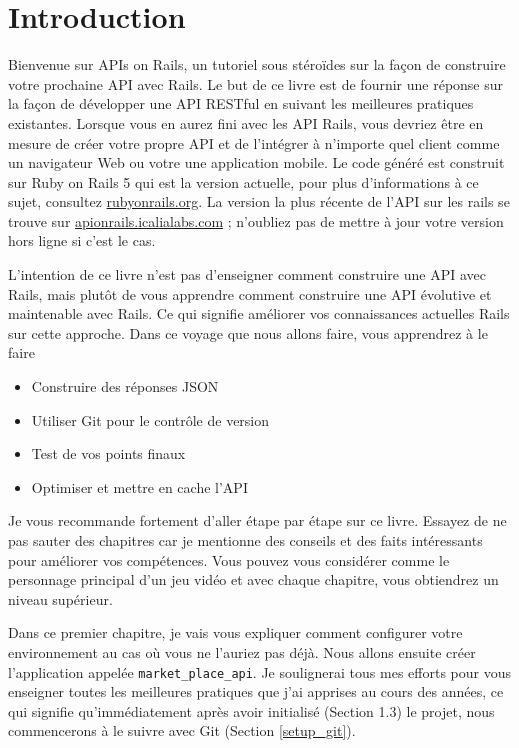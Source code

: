 \documentclass[]{report}
\begin{document}
\chapter{Introduction}

  Bienvenue sur APIs on Rails, un tutoriel sous stéroïdes sur la façon de construire votre prochaine API avec Rails. Le but de ce livre est de fournir une réponse sur la façon de développer une API RESTful en suivant les meilleures pratiques existantes. Lorsque vous en aurez fini avec les API Rails, vous devriez être en mesure de créer votre propre API et de l'intégrer à n'importe quel client comme un navigateur Web ou votre une application mobile. Le code généré est construit sur Ruby on Rails 5 qui est la version actuelle, pour plus d'informations à ce sujet, consultez \href{http://rubyonrails.org/}{rubyonrails.org}. La version la plus récente de l'API sur les rails se trouve sur \href{https://apionrails.icalialabs.com}{apionrails.icalialabs.com} ; n'oubliez pas de mettre à jour votre version hors ligne si c'est le cas.

  L'intention de ce livre n'est pas d'enseigner comment construire une API avec Rails, mais plutôt de vous apprendre comment construire une API évolutive et maintenable avec Rails. Ce qui signifie améliorer vos connaissances actuelles Rails  sur cette approche. Dans ce voyage que nous allons faire, vous apprendrez à le faire

  \begin{itemize}
    \item Construire des réponses JSON
    \item Utiliser Git pour le contrôle de version
    \item Test de vos points finaux
    \item Optimiser et mettre en cache l'API
  \end{itemize}

  Je vous recommande fortement d'aller étape par étape sur ce livre. Essayez de ne pas sauter des chapitres car je mentionne des conseils et des faits intéressants pour améliorer vos compétences. Vous pouvez vous considérer comme le personnage principal d'un jeu vidéo et avec chaque chapitre, vous obtiendrez un niveau supérieur.

  Dans ce premier chapitre, je vais vous expliquer comment configurer votre environnement au cas où vous ne l'auriez pas déjà. Nous allons ensuite créer l'application appelée \verb|market_place_api|. Je soulignerai tous mes efforts pour vous enseigner toutes les meilleures pratiques que j'ai apprises au cours des années, ce qui signifie qu'immédiatement après avoir initialisé (Section 1.3) le projet, nous commencerons à le suivre avec Git (Section \ref{setup_git}).
\end{document}
